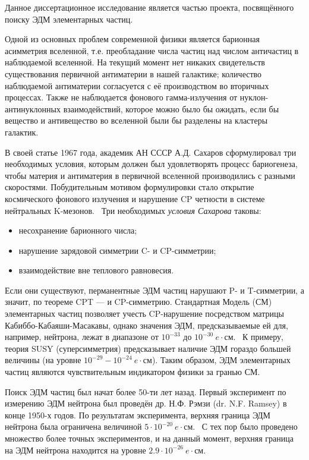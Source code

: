 
{\actuality} 
Данное диссертационное исследование является частью проекта, посвящённого поиску ЭДМ элементарных частиц.

Одной из основных проблем современной физики является барионная асимметрия вселенной, т.е. преобладание числа частиц над числом античастиц в наблюдаемой вселенной. На текущий момент нет никаких свидетельств существования первичной антиматерии в нашей галактике; количество наблюдаемой антиматерии согласуется с её производством во вторичных процессах. Также не наблюдается фонового гамма-излучения от нуклон-антинуклонных взаимодействий, которое можно было бы ожидать, если бы вещество и антивещество во вселенной были бы разделены на кластеры галактик.~\cite{Trodden:Baryogenesis} 

В своей статье 1967 года, академик АН СССР А.Д. Сахаров сформулировал три необходимых условия, которым должен был удовлетворять процесс бариогенеза, чтобы материя и антиматерия в первичной вселенной производились с разными скоростями. Побудительным мотивом формулировки стало открытие космического фонового излучения и нарушение CP четности в системе нейтральных K-мезонов.~\cite{Fitch:Kaon-CP-violation-1964} Три необходимых \emph{условия Сахарова} таковы:
\begin{itemize}
	\item несохранение барионного числа;
	\item нарушение зарядовой симметрии C- и CP-симметрии;
	\item взаимодействие вне теплового равновесия.
\end{itemize}

Если они существуют, перманентные ЭДМ частиц нарушают P- и T-симметрии, а значит, по теореме CPT --- и CP-симметрию. Стандартная Модель (СМ) элементарных частиц позволяет учесть CP-нарушение посредством матрицы Кабиббо-Кабаяши-Масакавы, однако значения ЭДМ, предсказываемые ей для, например, нейтрона, лежат в диапазоне от $10^{-33}$ до $10^{-30}~e\cdot$см.~\cite{Harris:Neutron2007} К примеру, теория SUSY (суперсимметрия) предсказывает наличие ЭДМ гораздо большей величины (на уровне $10^{-29} - 10^{-24}~e\cdot$см). Таким образом, ЭДМ элементарных частиц являются чувствительным индикатором физики за гранью СМ. 

Поиск ЭДМ частиц был начат более 50-ти лет назад. Первый эксперимент по измерению ЭДМ нейтрона был проведён др. Н.Ф. Рэмзи (dr. N.F. Ramsey) в конце 1950-х годов. По результатам эксперимента, верхняя граница ЭДМ нейтрона была ограничена величиной $5\cdot 10^{-20}~e\cdot$см.~\cite{Ramsey:Neutron1957} С тех пор было проведено множество более точных экспериментов, и на данный момент, верхняя граница на ЭДМ нейтрона находится на уровне $2.9\cdot 10^{-26}~e\cdot$см.~\cite{Baker:nEDM:Main, Baker:nEDM:Reply}

